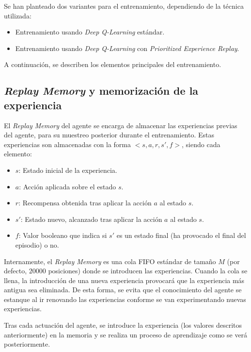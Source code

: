 Se han planteado dos variantes para el entrenamiento, dependiendo de la técnica utilizada:
\begin{itemize}
	\item Entrenamiento usando \textit{Deep Q-Learning} estándar.
	\item Entrenamiento usando \textit{Deep Q-Learning} con \textit{Prioritized Experience Replay}.
\end{itemize}

A continuación, se describen los elementos principales del entrenamiento.

\subsection{\textit{Replay Memory} y memorización de la experiencia}

El \textit{Replay Memory} del agente se encarga de almacenar las experiencias previas del agente, para su muestreo posterior durante el entrenamiento. Estas experiencias son almacenadas con la forma $<s, a, r, s', f>$, siendo cada elemento:

\begin{itemize}
\item $s$: Estado inicial de la experiencia.
\item $a$: Acción aplicada sobre el estado $s$.
\item $r$: Recompensa obtenida tras aplicar la acción $a$ al estado $s$.
\item $s'$: Estado nuevo, alcanzado tras aplicar la acción $a$ al estado $s$.
\item $f$: Valor booleano que indica si $s'$ es un estado final (ha provocado el final del episodio) o no.
\end{itemize}

Internamente, el \textit{Replay Memory} es una cola FIFO estándar de tamaño $M$ (por defecto, $20000$ posiciones) donde se introducen las experiencias. Cuando la cola se llena, la introducción de una nueva experiencia provocará que la experiencia más antigua sea eliminada. De esta forma, se evita que el conocimiento del agente se estanque al ir renovando las experiencias conforme se van experimentando nuevas experiencias.

Tras cada actuación del agente, se introduce la experiencia (los valores descritos anteriormente) en la memoria y se realiza un proceso de aprendizaje como se verá posteriormente.

